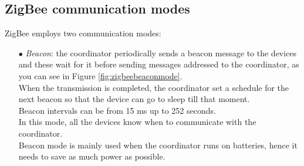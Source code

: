\documentclass[12pt]{report}
\begin{document}
{\begin{itemize}

\end{itemize}

\iffalse
\subsection{ZigBee communication modes}
\bigskip
ZigBee employs two communication modes:
\bigskip
\begin{itemize}
\setlength{\itemindent}{+4mm}
\item[$\bullet$] \emph{Beacon}: the coordinator periodically sends a beacon message to the devices and these wait for it before sending messages addressed to the coordinator, as you can see in Figure \ref{fig:zigbeebeaconmode}.\\
When the transmission is completed, the coordinator set a schedule for the next beacon so that the device can go to sleep till that moment.\\
Beacon intervals can be from 15 ms up to 252 seconds.\\
In this mode, all the devices know when to communicate with the coordinator.\\
Beacon mode is mainly used when the coordinator runs on batteries, hence it needs to save as much power as possible.


\end{itemize}}
\end{document}
